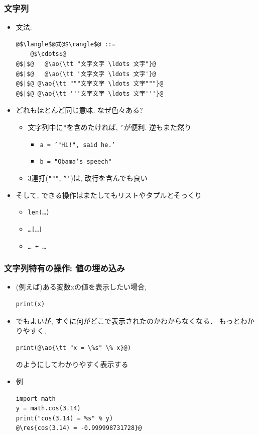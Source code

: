 \documentclass[10pt,dvipdfmx]{beamer}
\newcommand{\ore}[1]{{\color{orange}#1}}
\newcommand{\ao}[1]{{\color{blue}#1}}
\newcommand{\res}[1]{\ore{\textsl{#1}}}
\begin{document}
\begin{frame}[fragile]
\frametitle{文字列}
\begin{itemize}
\item 文法:
\begin{lstlisting}
@$\langle$@式@$\rangle$@ ::=
    @$\cdots$@
@$|$@   @\ao{\tt "文字文字 \ldots 文字"}@
@$|$@   @\ao{\tt '文字文字 \ldots 文字'}@
@$|$@ @\ao{\tt """文字文字 \ldots 文字"""}@
@$|$@ @\ao{\tt '''文字文字 \ldots 文字'''}@
\end{lstlisting}

\item どれもほとんど同じ意味. なぜ色々ある?
  \begin{itemize}
  \item 文字列中に{\tt "}を含めたければ, {\tt '}が便利. 逆もまた然り
    \begin{itemize}
    \item \ao{\tt a = '"Hi!", said he.'}
    \item \ao{\tt b = "Obama's speech"}
    \end{itemize}
  \item 3連打({\tt """}, {\tt '''})は, 改行を含んでも良い
  \end{itemize}

\item そして, できる操作はまたしてもリストやタプルとそっくり
  \begin{itemize}
  \item {\tt len(\ldots)}
  \item {\tt \ldots[\ldots]}
  \item {\tt \ldots\ + \ldots}
  \end{itemize}
\end{itemize}
\end{frame}

\begin{frame}[fragile]
\frametitle{文字列特有の操作: 値の埋め込み}
\begin{itemize}
\item (例えば)ある変数xの値を表示したい場合,
\begin{lstlisting}
print(x)
\end{lstlisting}
\item でもよいが, すぐに何がどこで表示されたのかわからなくなる．
もっとわかりやすく,
\begin{lstlisting}
print(@\ao{\tt "x = \%s" \% x}@)
\end{lstlisting}
のようにしてわかりやすく表示する

\item 例
\begin{lstlisting}
import math
y = math.cos(3.14)
print("cos(3.14) = %s" % y)
@\res{cos(3.14) = -0.999998731728}@
\end{lstlisting}
\end{itemize}
\end{frame}
\end{document}
